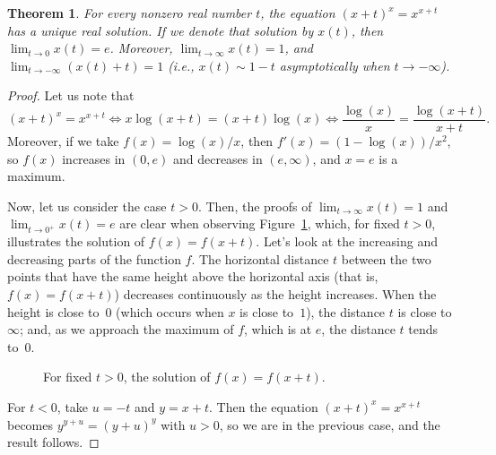 \documentclass[11pt, a4paper]{article}
\newtheorem*{theo}{Theorem}
\begin{document}
\begin{theo}
For every nonzero real number $t$, the equation $(x+t)^x = x^{x+t}$ has a unique real solution. If we denote that solution by $x(t)$, then $\lim_{t\to0} x(t) = e$.
Moreover, $\lim_{t\to\infty} x(t) = 1$, and $\lim_{t\to-\infty} (x(t)+t) = 1$ (i.e., $x(t) \sim 1-t$ asymptotically when $t\to-\infty$).
\end{theo}

\begin{proof}
Let us note that
\[
(x+t)^x = x^{x+t} 
\iff
x\log(x+t) = (x+t)\log(x)
\iff 
\frac{\log(x)}{x} = \frac{\log(x+t)}{x+t}.
\]
Moreover, if we take $f(x) = \log(x)/x$, then $f'(x) = (1-\log(x))/x^2$, 
so $f(x)$ increases in $(0,e)$ and decreases in $(e,\infty)$, and $x=e$ is a maximum.

Now, let us consider the case $t>0$. Then, the proofs of $\lim_{t\to\infty} x(t) = 1$ and $\lim_{t\to0^+} x(t) = e$ are clear when observing Figure~\ref{fig2}, which, for fixed $t>0$, illustrates the solution of $f(x)=f(x+t)$. Let's look at the increasing and decreasing parts of the function $f$. The horizontal distance $t$ between the two points that have the same height above the horizontal axis (that is, $f(x)=f(x+t)$) decreases continuously as the height increases. When the height is close to~$0$ (which occurs when $x$ is close to~$1$), the distance $t$ is close to~$\infty$; and, as we approach the maximum of $f$, which is at $e$, the distance $t$ tends to~$0$.
\begin{figure}[ht]
\centering
{}
\caption{For fixed $t>0$, the solution of $f(x)=f(x+t)$.}
\label{fig2}
\end{figure}

For $t<0$, take $u=-t$ and $y = x+t$. Then the equation $(x+t)^x = x^{x+t}$ becomes $y^{y+u} = (y+u)^y$ with $u>0$, so we are in the previous case, and the result follows.
\end{proof}
\end{document}
